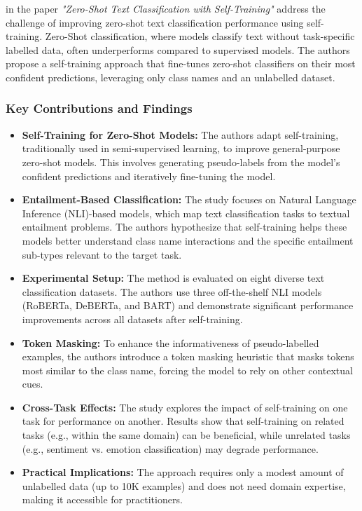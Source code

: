 \citet{gera_zero-shot_2022} in the paper \emph{"Zero-Shot Text Classification with Self-Training"} address the challenge of improving zero-shot text classification performance using self-training. Zero-Shot classification, where models classify text without task-specific labelled data, often underperforms compared to supervised models. The authors propose a self-training approach that fine-tunes zero-shot classifiers on their most confident predictions, leveraging only class names and an unlabelled dataset.
\newline

\subsubsection*{Key Contributions and Findings}

\begin{itemize}
    \item \textbf{Self-Training for Zero-Shot Models:} The authors adapt self-training, traditionally used in semi-supervised learning, to improve general-purpose zero-shot models. This involves generating pseudo-labels from the model's confident predictions and iteratively fine-tuning the model.
    
    \item \textbf{Entailment-Based Classification:} The study focuses on Natural Language Inference (NLI)-based models, which map text classification tasks to textual entailment problems. The authors hypothesize that self-training helps these models better understand class name interactions and the specific entailment sub-types relevant to the target task.
    
    \item \textbf{Experimental Setup:} The method is evaluated on eight diverse text classification datasets. The authors use three off-the-shelf NLI models (RoBERTa, DeBERTa, and BART) and demonstrate significant performance improvements across all datasets after self-training.
    
    \item \textbf{Token Masking:} To enhance the informativeness of pseudo-labelled examples, the authors introduce a token masking heuristic that masks tokens most similar to the class name, forcing the model to rely on other contextual cues.
    
    \item \textbf{Cross-Task Effects:} The study explores the impact of self-training on one task for performance on another. Results show that self-training on related tasks (e.g., within the same domain) can be beneficial, while unrelated tasks (e.g., sentiment vs. emotion classification) may degrade performance.
    
    \item \textbf{Practical Implications:} The approach requires only a modest amount of unlabelled data (up to 10K examples) and does not need domain expertise, making it accessible for practitioners.
\end{itemize}


